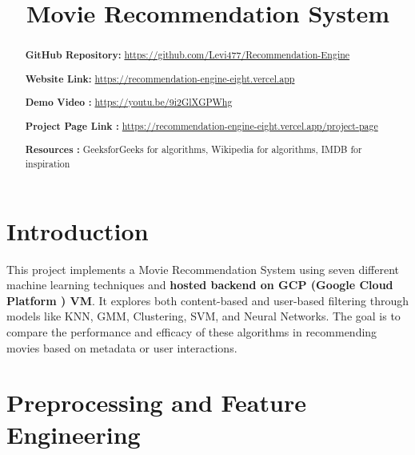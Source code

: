 \documentclass[a4paper]{article}
\title{\textbf{Movie Recommendation System}}
\date{}
\theoremstyle{plain}
\begin{document}
\maketitle

\begin{abstract}
    
    \vspace{1em}
    \noindent\textbf{GitHub Repository:} \href{https://github.com/Levi477/Recommendation-Engine}
    {https://github.com/Levi477/Recommendation-Engine}
    
    \vspace{1em}
    \noindent\textbf{Website Link:}
    \href{https://recommendation-engine-eight.vercel.app}
    {https://recommendation-engine-eight.vercel.app}

    \vspace{1em}
    \noindent\textbf{Demo Video : }
    \href{https://youtu.be/9i2GlXGPWhg}
    {https://youtu.be/9i2GlXGPWhg}

    \vspace{1em}
    \noindent\textbf{Project Page Link : }
    \href{https://recommendation-engine-eight.vercel.app/project-page}
    {https://recommendation-engine-eight.vercel.app/project-page}
    
    \vspace{1em}
    \noindent\textbf{Resources : } 
    GeeksforGeeks for algorithms, Wikipedia for algorithms, IMDB for inspiration


    \end{abstract}

\tableofcontents

\newpage
\section{Introduction}
\label{sec:intro}

 This project implements a Movie Recommendation System using seven different machine learning techniques and \textbf{hosted backend on GCP (Google Cloud Platform ) VM}. It explores both content-based and user-based filtering through models like KNN, GMM, Clustering, SVM, and Neural Networks. The goal is to compare the performance and efficacy of these algorithms in recommending movies based on metadata or user interactions. 

\newpage
\section{Preprocessing and Feature Engineering}
\label{sec:preprocessing}
\end{document}
